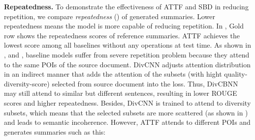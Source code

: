 \textbf{Repeatedness.}
To demonstrate the effectiveness of ATTF and SBD in reducing repetition, 
we compare \textit{repeatedness} () 
of generated summaries.
Lower repeatedness 
means the model is more capable of reducing repetition.
In , Gold row shows the repeatedness scores of
reference summaries. ATTF achieves the lowest
score among all baselines without any operations at test time. 
As shown in ,  and ,
baseline models suffer from severe repetition problem because they attend to the same POIs 
of the source document. DivCNN adjusts attention distribution in an indirect manner that adds the attention of the subsets (with hight quality-diversity-score) selected from source document into the loss. Thus, DivCBNN may still attend to similar but different sentences, resulting in lower ROUGE scores and higher repeatedness. 
Besides, DivCNN is trained to attend to diversity subsets, 
which means that the selected subsets are more scattered (as shown in ) and leads to semantic incoherence.
However, ATTF attends to different POIs and generates summaries 
such as this:



